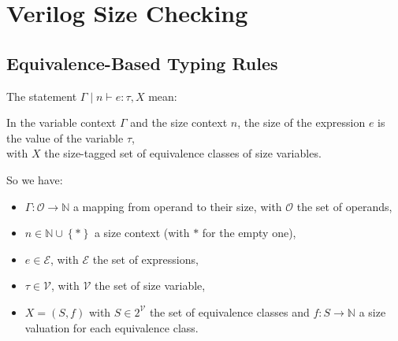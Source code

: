 \documentclass{article}
\begin{document}
\section*{Verilog Size Checking}

\subsection*{Equivalence-Based Typing Rules}

The statement $\Gamma \mid n \vdash e: \tau, X$ mean:
\begin{center}
  In the variable context $\Gamma$ and the size context $n$, the size of the expression $e$ is the value of the variable $\tau$,\\
  with $X$ the size-tagged set of equivalence classes of size
  variables.
\end{center}

So we have:
\begin{itemize}
  \item $\Gamma: \mathcal{O} \to \mathbb{N}$ a mapping from operand to
        their size, with $\mathcal{O}$ the set of operands,
  \item $n \in \mathbb{N} \cup \left\{\ast\right\}$ a size context (with
        $\ast$ for the empty one),
  \item $e \in \mathcal{E}$, with $\mathcal{E}$ the set of expressions,
  \item $\tau \in \mathcal{V}$, with $\mathcal{V}$ the set of size
        variable,
  \item $X = (S, f)$ with $S \in 2^{\mathcal{V}}$ the set of equivalence
        classes and $f: S \to \mathbb{N}$ a size valuation for each
        equivalence class.
\end{itemize}
\end{document}
